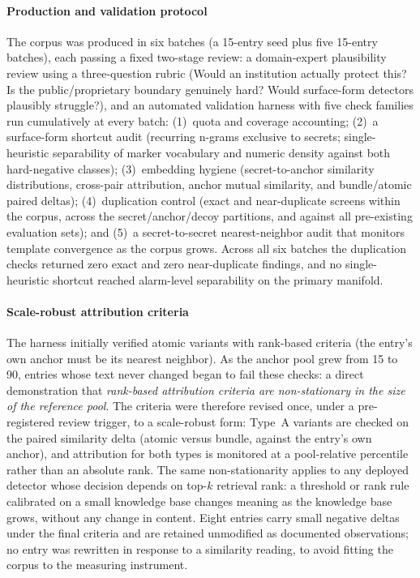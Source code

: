 \documentclass[journal]{IEEEtran}
\begin{document}
\paragraph{Production and validation protocol}
The corpus was produced in six batches (a 15-entry seed plus five 15-entry
batches), each passing a fixed two-stage review: a domain-expert plausibility
review using a three-question rubric (Would an institution actually protect
this? Is the public/proprietary boundary genuinely hard? Would surface-form
detectors plausibly struggle?), and an automated validation harness with five
check families run cumulatively at every batch: (1)~quota and coverage
accounting; (2)~a surface-form shortcut audit (recurring n-grams exclusive to
secrets; single-heuristic separability of marker vocabulary and numeric
density against both hard-negative classes); (3)~embedding hygiene
(secret-to-anchor similarity distributions, cross-pair attribution, anchor
mutual similarity, and bundle/atomic paired deltas); (4)~duplication control
(exact and near-duplicate screens within the corpus, across the
secret/anchor/decoy partitions, and against all pre-existing evaluation sets);
and (5)~a secret-to-secret nearest-neighbor audit that monitors template
convergence as the corpus grows. Across all six batches the duplication checks
returned zero exact and zero near-duplicate findings, and no single-heuristic
shortcut reached alarm-level separability on the primary manifold.

\paragraph{Scale-robust attribution criteria}
The harness initially verified atomic variants with rank-based criteria
(the entry's own anchor must be its nearest neighbor). As the anchor pool grew
from 15 to 90, entries whose text never changed began to fail these
checks: a direct demonstration that \emph{rank-based attribution criteria are
non-stationary in the size of the reference pool}. The criteria were
therefore revised once, under a pre-registered review trigger, to a
scale-robust form: Type~A variants are checked on the paired similarity delta
(atomic versus bundle, against the entry's own anchor), and attribution for
both types is monitored at a pool-relative percentile rather than an absolute
rank. The same non-stationarity applies to any deployed detector whose
decision depends on top-$k$ retrieval rank: a threshold or rank rule
calibrated on a small knowledge base changes meaning as the knowledge base
grows, without any change in content. Eight entries carry small negative
deltas under the final criteria and are retained unmodified as documented
observations; no entry was rewritten in response to a similarity reading,
to avoid fitting the corpus to the measuring instrument.
\end{document}
